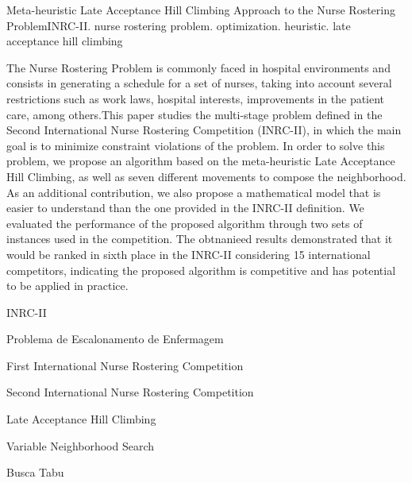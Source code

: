 \documentclass[cic,tc, twoside]{iiufrgs}
\begin{document}

\begin{englishabstract}{Meta-heuristic Late Acceptance Hill Climbing Approach to the Nurse Rostering Problem}{INRC-II. nurse rostering problem. optimization. heuristic. late acceptance hill climbing}

The Nurse Rostering Problem is commonly faced in hospital environments and consists in generating a schedule for a set of nurses, taking into account several restrictions such as work laws, hospital interests, improvements in the patient care, among others.This paper studies the multi-stage problem defined in the Second International Nurse Rostering Competition (INRC-II), in which the main goal is to minimize constraint violations of the problem. In order to solve this problem, we propose an algorithm based on the meta-heuristic Late Acceptance Hill Climbing, as well as seven different movements to compose the neighborhood. As an additional contribution, we also propose a mathematical model that is easier to understand than the one provided in the INRC-II definition. We evaluated the performance of the proposed algorithm through two sets of instances used in the competition. The obtnanieed results demonstrated that it would be ranked in sixth place in the INRC-II considering 15 international competitors, indicating the proposed algorithm is competitive and has potential to be applied in practice.
\end{englishabstract}

\listoffigures

\listoftables

\begin{listofabbrv}{INRC-II}
	\item[PEE] Problema de Escalonamento de Enfermagem
	\item[INRC-I] First International Nurse Rostering Competition
    \item[INRC-II] Second International Nurse Rostering Competition
    \item[LAHC] Late Acceptance Hill Climbing
	\item[VNS] Variable Neighborhood Search
	\item[BT] Busca Tabu
	
    
\end{listofabbrv}
\end{document}
